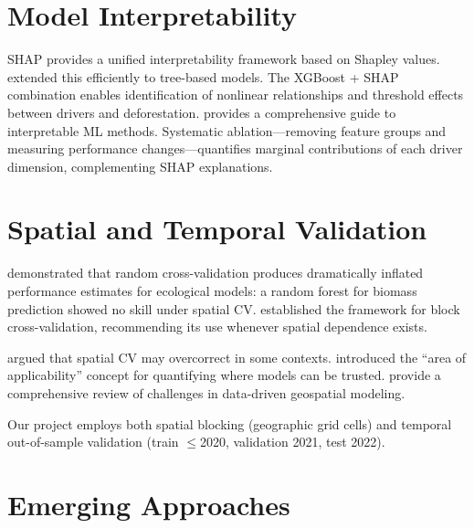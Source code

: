 \documentclass[11pt,a4paper]{article}
\begin{document}
\section{Model Interpretability}

SHAP \citep{Lundberg2017} provides a unified interpretability framework based on Shapley values. \citet{Lundberg2020} extended this efficiently to tree-based models. The XGBoost + SHAP combination enables identification of nonlinear relationships and threshold effects between drivers and deforestation. \citet{Molnar2022} provides a comprehensive guide to interpretable ML methods. Systematic ablation---removing feature groups and measuring performance changes---quantifies marginal contributions of each driver dimension, complementing SHAP explanations.

\section{Spatial and Temporal Validation}

\citet{Ploton2020} demonstrated that random cross-validation produces dramatically inflated performance estimates for ecological models: a random forest for biomass prediction showed no skill under spatial CV. \citet{Roberts2017} established the framework for block cross-validation, recommending its use whenever spatial dependence exists.

\citet{Wadoux2021} argued that spatial CV may overcorrect in some contexts. \citet{Meyer2021} introduced the ``area of applicability'' concept for quantifying where models can be trusted. \citet{Meyer2024} provide a comprehensive review of challenges in data-driven geospatial modeling.

Our project employs both spatial blocking (geographic grid cells) and temporal out-of-sample validation (train $\leq$2020, validation 2021, test 2022).

\section{Emerging Approaches}
\end{document}
